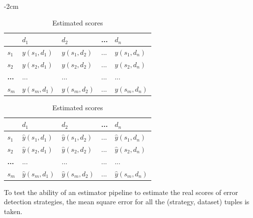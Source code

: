 \begin{table}%
	\centering
	\addtolength{\leftskip} {-2cm}
	\addtolength{\rightskip}{-2cm}
	\captionsetup[subtable]{position = below}
	\captionsetup[table]{position=top}
	\caption{$m \times n$ (strategies $\times$ datasets) matrix of scores}
	\begin{subtable}{0.5\linewidth}
		\centering
		\begin{tabular}{|l|l|l|l|l|}
			\hline
			               & \textbf{$d_1$} & \textbf{$d_2$} & \textbf{...} & \textbf{$d_n$} \\ \hline
			\textbf{$s_1$} & $y(s_1, d_1)$  & $y(s_1, d_2)$  & ...          & $y(s_1, d_n)$  \\ \hline
			\textbf{$s_2$} & $y(s_2, d_1)$  & $y(s_2, d_2)$  & ...          & $y(s_2, d_n)$  \\ \hline
			\textbf{...}   & ...            & ...            & ...          & ...            \\ \hline
			\textbf{$s_m$} & $y(s_m, d_1)$  & $y(s_m, d_2)$  & ...          & $y(s_m, d_n)$  \\ \hline
		\end{tabular}
		\caption{Real scores}
		\label{tab:realscores}
	\end{subtable}%
	\hspace*{4em}
	\begin{subtable}{0.5\linewidth}
		\centering
		\begin{tabular}{|l|l|l|l|l|}
			\hline
			               & \textbf{$d_1$}      & \textbf{$d_2$}      & \textbf{...} & \textbf{$d_n$}      \\ \hline
			\textbf{$s_1$} & $\hat{y}(s_1, d_1)$ & $\hat{y}(s_1, d_2)$ & ...          & $\hat{y}(s_1, d_n)$ \\ \hline
			\textbf{$s_2$} & $\hat{y}(s_2, d_1)$ & $\hat{y}(s_2, d_2)$ & ...          & $\hat{y}(s_2, d_n)$ \\ \hline
			\textbf{...}   & ...                 & ...                 & ...          & ...                 \\ \hline
			\textbf{$s_m$} & $\hat{y}(s_m, d_1)$ & $\hat{y}(s_m, d_2)$ & ...          & $\hat{y}(s_m, d_n)$ \\ \hline
		\end{tabular}
		\caption{Estimated scores}
		\label{tab:estimatedscores}
	\end{subtable}
\end{table}
       


To test the ability of an estimator pipeline to estimate the real scores of error detection strategies, the mean square error for all the (strategy, dataset) tuples is taken. 

